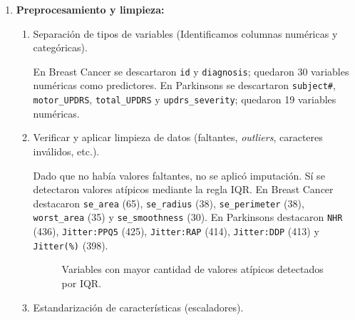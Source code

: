 \documentclass{article}
\begin{document}
\begin{enumerate}
\begin{enumerate}
      \begin{figure}[h!]
      \centering
      \caption{Distribución de clases por conjunto de datos.}
      \label{fig:class-distribution}
      \end{figure}

      \item Análisis de valores faltantes (porcentaje de valores faltantes por columna).

      No se encontraron valores faltantes en ninguno de los dos conjuntos de datos. Por esta razón, no fue necesario imputar valores en la etapa de limpieza.
    \end{enumerate}

  \item \textbf{Preprocesamiento y limpieza:}
    \begin{enumerate}
      \item Separación de tipos de variables (Identificamos columnas numéricas y categóricas).

      En Breast Cancer se descartaron \texttt{id} y \texttt{diagnosis}; quedaron 30 variables numéricas como predictores. En Parkinsons se descartaron \texttt{subject\#}, \texttt{motor\_UPDRS}, \texttt{total\_UPDRS} y \texttt{updrs\_severity}; quedaron 19 variables numéricas.

      \item Verificar y aplicar limpieza de datos (faltantes, \textit{outliers}, caracteres inválidos, etc.).

      Dado que no había valores faltantes, no se aplicó imputación. Sí se detectaron valores atípicos mediante la regla IQR. En Breast Cancer destacaron \texttt{se\_area} (65), \texttt{se\_radius} (38), \texttt{se\_perimeter} (38), \texttt{worst\_area} (35) y \texttt{se\_smoothness} (30). En Parkinsons destacaron \texttt{NHR} (436), \texttt{Jitter:PPQ5} (425), \texttt{Jitter:RAP} (414), \texttt{Jitter:DDP} (413) y \texttt{Jitter(\%)} (398).

      \begin{figure}[h!]
      \centering
      \caption{Variables con mayor cantidad de valores atípicos detectados por IQR.}
      \label{fig:outliers}
      \end{figure}

      \item Estandarización de características (escaladores).


\end{enumerate}
\end{enumerate}
\end{document}
